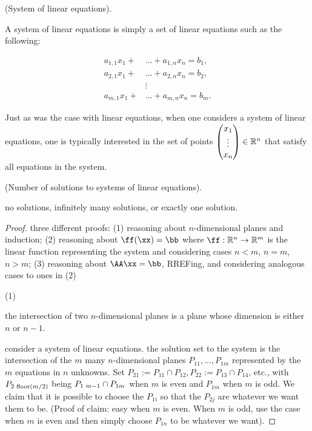 \begin{defn}
    (System of linear equations).
    
    A system of linear equations is simply a set of linear equations such as the following:
    
    \begin{align*}
        a_{1,1} x_1 + &... + a_{1,n} x_n = b_1, \\
        a_{2,1} x_1 + &... + a_{2,n} x_n = b_2, \\
        &\vdots \\
        a_{m,1} x_1 + &... + a_{m,n} x_n = b_m.
    \end{align*}
    
    Just as was the case with linear equations, when one considers a system of linear equations, one is typically interested in the set of points  $\begin{pmatrix} x_1 \\ \vdots \\ x_n \end{pmatrix} \in \mathbb{R}^n$ that satisfy all equations in the system.
\end{defn}

\begin{deriv}
    (Number of solutions to systems of linear equations). 
    
    no solutions, infinitely many solutions, or exactly one solution.
\end{deriv}

\begin{proof}
    three different proofs: (1) reasoning about $n$-dimensional planes and induction; (2) reasoning about $\ff(\xx) = \bb$ where $\ff:\R^n \rightarrow \R^m$ is the linear function representing the system and considering cases $n < m$, $n = m$, $n > m$; (3) reasoning about $\AA \xx = \bb$, RREFing, and considering analogous cases to ones in (2)
    
    (1)
    
    the intersection of two $n$-dimensional planes is a plane whose dimension is either $n$ or $n - 1$.
    
    consider a system of linear equations. the solution set to the system is the intersection of the $m$ many $n$-dimensional planes $P_{11}, ..., P_{1m}$ represented by the $m$ equations in $n$ unknowns. Set $P_{21} := P_{11} \cap P_{12}, P_{22} := P_{13} \cap P_{14}$, etc., with $P_{2 \text{ } \text{floor}(m/2)}$ being $P_{1\text{ } m - 1} \cap P_{1m}$ when $m$ is even and $P_{1m}$ when $m$ is odd. We claim that it is possible to choose the $P_{1i}$ so that the $P_{2j}$ are whatever we want them to be. (Proof of claim: easy when $m$ is even. When $m$ is odd, use the case when $m$ is even and then simply choose $P_{1n}$ to be whatever we want).
\end{proof}


